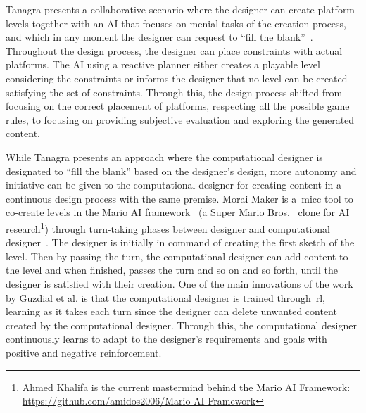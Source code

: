 Tanagra presents a collaborative scenario where the designer can create platform levels together with an AI that focuses on menial tasks of the creation process, and which in any moment the designer can request to ``fill the blank''~\cite{smith_tanagra_2011}. Throughout the design process, the designer can place constraints with actual platforms. The AI using a reactive planner either creates a playable level considering the constraints or informs the designer that no level can be created satisfying the set of constraints. Through this, the design process shifted from focusing on the correct placement of platforms, respecting all the possible game rules, to focusing on providing subjective evaluation and exploring the generated content.


While Tanagra presents an approach where the computational designer is designated to ``fill the blank'' based on the designer's design, more autonomy and initiative can be given to the computational designer for creating content in a continuous design process with the same premise. Morai Maker is a~\acrshort{micc} tool to co-create levels in the Mario AI framework~\cite{karakovskiy_mario_2012} (a Super Mario Bros.~\cite{mario} clone for AI research\footnote{Ahmed Khalifa is the current mastermind behind the Mario AI Framework: \url{https://github.com/amidos2006/Mario-AI-Framework}}) through turn-taking phases between designer and computational designer~\cite{guzdial_co-creative_2018}. The designer is initially in command of creating the first sketch of the level. Then by passing the turn, the computational designer can add content to the level and when finished, passes the turn and so on and so forth, until the designer is satisfied with their creation. One of the main innovations of the work by Guzdial et al. is that the computational designer is trained through~\acrshort{rl}, learning as it takes each turn since the designer can delete unwanted content created by the computational designer. Through this, the computational designer continuously learns to adapt to the designer's requirements and goals with positive and negative reinforcement.


